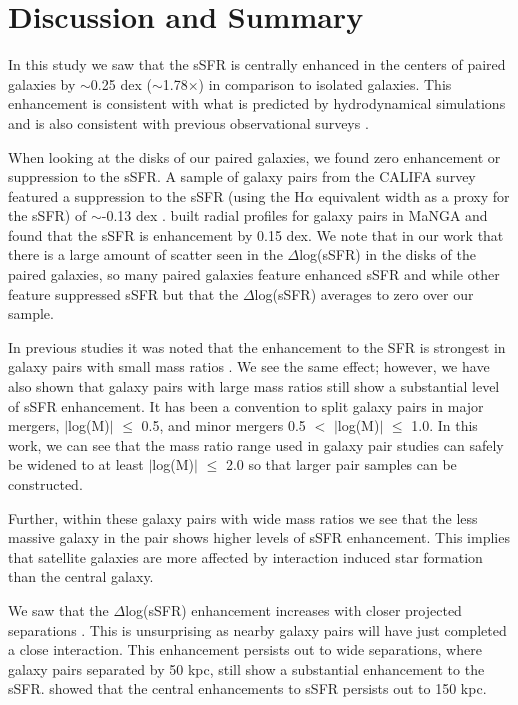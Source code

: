 \documentclass[iop,revtex4,twocolumn,apj,numberedappendix,appendixfloats]{emulateapj}
\begin{document}
\section{Discussion and Summary}\label{sec:sum}

In this study we saw that the sSFR is centrally enhanced in the centers of paired galaxies by $\sim$0.25 dex ($\sim$1.78$\times$) in comparison to isolated galaxies. This enhancement is consistent with what is predicted by hydrodynamical simulations \citep{Scudder:2012} and is also consistent with previous observational surveys \citep{Ellison:2008, Barrera-Ballesteros:2015, Pan:2019}. 

When looking at the disks of our paired galaxies, we found zero enhancement or suppression to the sSFR. A sample of galaxy pairs from the CALIFA survey featured a suppression to the sSFR (using the H$\alpha$ equivalent width as a proxy for the sSFR) of $\sim$-0.13 dex \citep{Barrera-Ballesteros:2015}. \citet{Pan:2019} built radial profiles for galaxy pairs in MaNGA and found that the sSFR is enhancement by 0.15 dex. We note that in our work that there is a large amount of scatter seen in the $\Delta$log(sSFR) in the disks of the paired galaxies, so many paired galaxies feature enhanced sSFR and while other feature suppressed sSFR but that the $\Delta$log(sSFR) averages to zero over our sample.

In previous studies it was noted that the enhancement to the SFR is strongest in galaxy pairs with small mass ratios \citet{Ellison:2008}. We see the same effect; however, we have also shown that galaxy pairs with large mass ratios still show a substantial level of sSFR enhancement. It has been a convention to split galaxy pairs in major mergers, $|$log(M)$|$ $\le$ 0.5, and minor mergers 0.5 $<$ $|$log(M)$|$ $\le$ 1.0. In this work, we can see that the mass ratio range used in galaxy pair studies can safely be widened to at least $|$log(M)$|$ $\le$ 2.0 so that larger pair samples can be constructed.  

Further, within these galaxy pairs with wide mass ratios we see that the less massive galaxy in the pair shows higher levels of sSFR enhancement. This implies that satellite galaxies are more affected by interaction induced star formation than the central galaxy. 

We saw that the $\Delta$log(sSFR) enhancement increases with closer projected separations \citet{Ellison:2008, Scudder:2012, Patton:2013}. This is unsurprising as nearby galaxy pairs will have just completed a close interaction. This enhancement persists out to wide separations, where galaxy pairs separated by 50 kpc, still show a substantial enhancement to the sSFR. \citet{Patton:2013} showed that the central enhancements to sSFR persists out to 150 kpc. 
 
\end{document}
